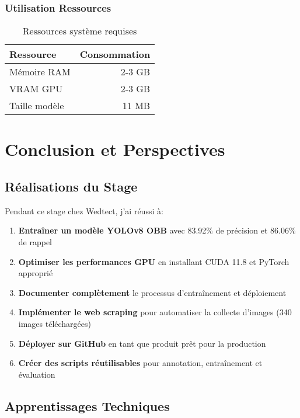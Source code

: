 \documentclass[a4paper,12pt]{report}
\begin{document}
\subsection{Utilisation Ressources}

\begin{table}[H]
    \centering
    \begin{tabular}{|l|r|}
    \hline
    \textbf{Ressource} & \textbf{Consommation} \\
    \hline
    Mémoire RAM & ~2-3 GB \\
    \hline
    VRAM GPU & ~2-3 GB \\
    \hline
    Taille modèle & 11 MB \\
    \hline
    \end{tabular}
    \caption{Ressources système requises}
\end{table}

\chapter{Conclusion et Perspectives}

\section{Réalisations du Stage}

Pendant ce stage chez Wedtect, j'ai réussi à:

\begin{enumerate}
    \item \textbf{Entraîner un modèle YOLOv8 OBB} avec 83.92\% de précision et 86.06\% de rappel
    \item \textbf{Optimiser les performances GPU} en installant CUDA 11.8 et PyTorch approprié
    \item \textbf{Documenter complètement} le processus d'entraînement et déploiement
    \item \textbf{Implémenter le web scraping} pour automatiser la collecte d'images (340 images téléchargées)
    \item \textbf{Déployer sur GitHub} en tant que produit prêt pour la production
    \item \textbf{Créer des scripts réutilisables} pour annotation, entraînement et évaluation
\end{enumerate}

\section{Apprentissages Techniques}
\end{document}
